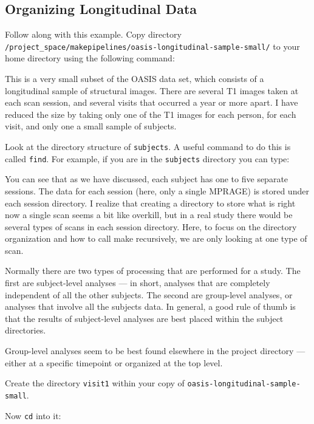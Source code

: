 \subsection{Organizing Longitudinal Data}

Follow along with this example. Copy directory 
\newline\texttt{/project_space/makepipelines/oasis-longitudinal-sample-small/} \newline
to your home directory using the following command:

This is a very small subset of the OASIS data set, which consists of a
longitudinal sample of structural images. There are several T1 images
taken at each scan session, and several visits that occurred a year or
more apart. I have reduced the size by taking only one of the T1 images
for each person, for each visit, and only one a small sample of
subjects.

Look at the directory structure of \texttt{subjects}. A useful command to do this is called \texttt{find}. For example, if you are in the \texttt{subjects} directory you can type:

You can see that as we have discussed, each subject has one to five
separate sessions. The data for each session (here, only a single
MPRAGE) is stored under each session directory. I realize that
creating a directory to store what is right now a single scan seems a
bit like overkill, but in a real study there would be several types of
scans in each session directory. Here, to focus on the directory
organization and how to call make recursively, we are only looking at
one type of scan.

Normally there are two types of processing that are performed for a
study. The first are subject-level analyses --- in short, analyses that
are completely independent of all the other subjects. The second are
group-level analyses, or analyses that involve all the subjects
data. In general, a good rule of thumb is that the results of
subject-level analyses are best placed within the subject directories.

Group-level analyses seem to be best found elsewhere in the project
directory --- either at a specific timepoint or organized at the top
level.

Create the directory \texttt{visit1} within your copy of \texttt{oasis-longitudinal-sample-small}. 

Now \texttt{cd} into it:

